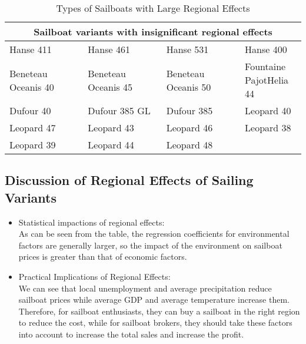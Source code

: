 \vspace{-0.5cm}
\begin{table}[H]
    \begin{center}
    \caption{ Types of Sailboats with Large Regional Effects}
    \resizebox{\textwidth}{!}
    {\begin{tabular}{p{4cm} p{4cm} p{4cm} p{4cm}}
    \toprule[2pt]
    \multicolumn{4}{c}{Sailboat variants with insignificant regional effects}\\
    \midrule
    Hanse 411  & Hanse 461 & Hanse 531 & Hanse 400 \\
    Beneteau Oceanis 40 & Beneteau Oceanis 45  & Beneteau Oceanis 50 & \makecell[c]{Fountaine\\PajotHelia 44} \\
    Dufour 40   & Dufour 385 GL & Dufour 385 & Leopard 40\\
    Leopard 47 & Leopard 43 & Leopard 46 & Leopard 38  \\
    Leopard 39 & Leopard 44 & Leopard 48 & \\
    \bottomrule[2pt]
    \end{tabular}}
    \end{center}
\end{table}
\vspace{-0.5cm}

\subsection{Discussion of Regional Effects of Sailing Variants}
\begin{itemize}
    \setlength{\parsep}{0ex} %
    \setlength{\topsep}{2ex} %
    \setlength{\itemsep}{1ex} %
    \item Statistical impactions of regional effects:\\
    As can be seen from the table, the regression coefficients for environmental factors are generally larger, so the impact of the environment on sailboat prices is greater than that of economic factors.
    \item Practical Implications of Regional Effects:\\
    We can see that local unemployment and average precipitation reduce sailboat prices while average GDP and average temperature increase them. Therefore, for sailboat enthusiasts, they can buy a sailboat in the right region to reduce the cost, while for sailboat brokers, they should take these factors into account to increase the total sales and increase the profit.
\end{itemize}

